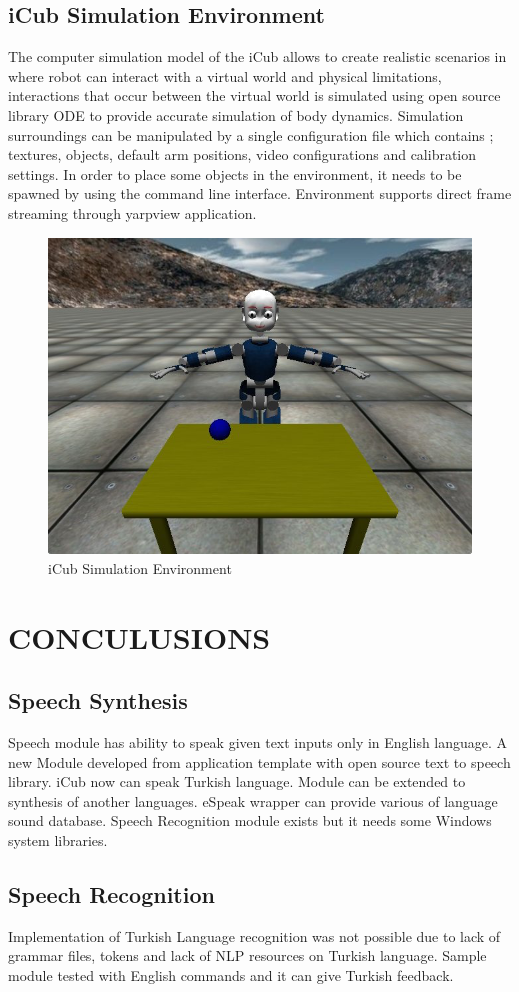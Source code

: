 \documentclass[a4paper, 12pt]{report}
\begin{document}
\section{iCub Simulation Environment}
The computer simulation model of the iCub allows to create realistic scenarios 
in where robot can interact with a virtual world and physical limitations, 
interactions that occur between the virtual world is simulated using open 
source library ODE to provide accurate simulation of body dynamics.
Simulation surroundings can be manipulated by a single configuration file which 
contains ; textures, objects, default arm positions, video configurations and 
calibration settings. In order to place some objects in the environment, it 
needs to be spawned by using the command line interface. Environment supports 
direct frame streaming through yarpview application.
\begin{figure}[h!]
\centering
\includegraphics[width=0.5\linewidth]{sim}
\caption{iCub Simulation Environment}
\label{fig:icub}
\end{figure}
\chapter{CONCULUSIONS}
\section{Speech Synthesis}
Speech module has ability to speak given text inputs only in English language. 
A new Module developed from application template with open source text to 
speech library. iCub now can speak Turkish language. Module can be extended to 
synthesis of another languages. eSpeak wrapper can provide various of language 
sound database. Speech Recognition module exists but it needs some Windows 
system libraries.
\section{Speech Recognition}
Implementation of Turkish Language recognition was not possible due to lack of 
grammar files, tokens and lack of NLP resources on Turkish language. Sample 
module tested with English commands and it can give Turkish feedback.
\end{document}
